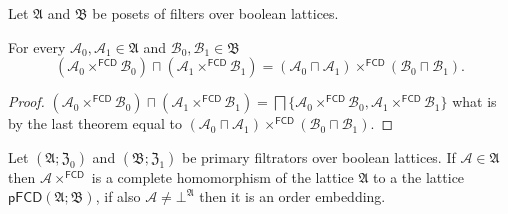 \begin{cor}
Let $\mathfrak{A}$ and $\mathfrak{B}$ be posets of filters over
boolean lattices.

For every $\mathcal{A}_{0},\mathcal{A}_{1}\in\mathfrak{A}$ and $\mathcal{B}_{0},\mathcal{B}_{1}\in\mathfrak{B}$
\[
(\mathcal{A}_{0}\times^{\mathsf{FCD}}\mathcal{B}_{0})\sqcap(\mathcal{A}_{1}\times^{\mathsf{FCD}}\mathcal{B}_{1})=(\mathcal{A}_{0}\sqcap\mathcal{A}_{1})\times^{\mathsf{FCD}}(\mathcal{B}_{0}\sqcap\mathcal{B}_{1}).
\]
\end{cor}
\begin{proof}
$(\mathcal{A}_{0}\times^{\mathsf{FCD}}\mathcal{B}_{0})\sqcap(\mathcal{A}_{1}\times^{\mathsf{FCD}}\mathcal{B}_{1})=\bigsqcap\{\mathcal{A}_{0}\times^{\mathsf{FCD}}\mathcal{B}_{0},\mathcal{A}_{1}\times^{\mathsf{FCD}}\mathcal{B}_{1}\}$
what is by the last theorem equal to $(\mathcal{A}_{0}\sqcap\mathcal{A}_{1})\times^{\mathsf{FCD}}(\mathcal{B}_{0}\sqcap\mathcal{B}_{1})$.\end{proof}
\begin{thm}
Let $(\mathfrak{A};\mathfrak{Z}_{0})$ and $(\mathfrak{B};\mathfrak{Z}_{1})$
be primary filtrators over boolean lattices. If $\mathcal{A}\in\mathfrak{A}$
then $\mathcal{A}\times^{\mathsf{FCD}}$ is a complete homomorphism
of the lattice $\mathfrak{A}$ to a the lattice $\mathsf{pFCD}(\mathfrak{A};\mathfrak{B})$,
if also $\mathcal{A}\neq\bot^{\mathfrak{A}}$ then it is an order
embedding.\end{thm}
